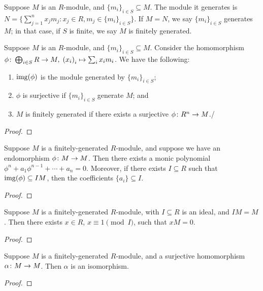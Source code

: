 \begin{definition}
    Suppose \(M\) is an \(R\)-module, and \({\{m_i\}}_{i \in S} \subseteq M\).
    The module it generates is \(N = \{\sum_{j=1}^n x_j m_j : x_j \in R, m_j \in {\{m_i\}}_{i \in S}\}\).
    If \(M = N\), we say \({\{m_i\}}_{i \in S}\) generates \(M\);
    in that case, if \(S\) is finite, we say \(M\) is finitely generated.
\end{definition}
\begin{proposition}
    Suppose \(M\) is an \(R\)-module, and \({\{m_i\}}_{i \in S} \subseteq M\).
    Consider the homomorphism \(\phi\colon\bigoplus_{i \in S} R\to M,\;{(x_i)}_i\mapsto\sum_i x_i m_i\).
    We have the following:
    \begin{enumerate}[label={(\alph*)}, itemsep=0mm]
        \item \(\operatorname{img}(\phi)\) is the module generated by \({\{m_i\}}_{i \in S}\);
        \item \(\phi\) is surjective if \({\{m_i\}}_{i \in S}\) generate \(M\); and
        \item \(M\) is finitely generated if there exists a surjective \(\phi\colon R^n\to M\)./
    \end{enumerate}
\end{proposition}
\begin{proof}
    
\end{proof}

\begin{lemma}
    Suppose \(M\) is a finitely-generated \(R\)-module,
    and suppose we have an endomorphism \(\phi\colon M\to M\).
    Then there exists a monic polynomial \(\phi^n + a_1\phi^{n-1} + \cdots + a_n = 0\).
    Moreover, if there exists \(I \subseteq R\) such that \(\operatorname{img}(\phi) \subseteq IM\),
    then the coefficients \(\{a_i\} \subseteq I\).
\end{lemma}
\begin{proof}
    
\end{proof}
\begin{corollary}
    Suppose \(M\) is a finitely-generated \(R\)-module,
    with \(I \subseteq R\) is an ideal, and \(IM = M\).
    Then there exists \(x \in R\), \(x \equiv 1\pmod{I}\), such that \(xM = 0\).
\end{corollary}
\begin{proof}
    
\end{proof}
\begin{corollary}
    Suppose \(M\) is a finitely-generated \(R\)-module,
    and a surjective homomorphism \(\alpha\colon M\to M\).
    Then \(\alpha\) is an isomorphism.
\end{corollary}
\begin{proof}
    
\end{proof}

